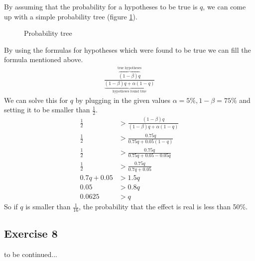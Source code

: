 \documentclass[../main/Notes.tex]{subfiles}
\begin{document}
By assuming that the probability for a hypotheses to be true is $q$, we can come up with a simple probability tree (figure \ref{fig:2014-05-30_ex6tree}).

\begin{figure}[!ht]
  
  \caption{Probability tree}
  \label{fig:2014-05-30_ex6tree}
\end{figure}

By using the formulas for hypotheses which were found to be true we can fill the formula mentioned above.
\begin{align*}
\frac{\overbrace{(1-\beta)q}^\text{true hypotheses}}{\underbrace{(1-\beta)q+\alpha(1-q)}_\text{hypotheses found true}}
\end{align*}
We can solve this for $q$ by plugging in the given values $\alpha=5\%,1-\beta=75\%$ and setting it to be smaller than $\frac{1}{2}$.
\begin{align*}
\frac{1}{2}&>\frac{(1-\beta)q}{(1-\beta)q+\alpha(1-q)} \\
\frac{1}{2}&>\frac{0.75q}{0.75q+0.05(1-q)} \\
\frac{1}{2}&>\frac{0.75q}{0.75q+0.05-0.05q} \\
\frac{1}{2}&>\frac{0.75q}{0.7q+0.05} \\
0.7q+0.05  &>1.5q \\
0.05       &>0.8q \\
0.0625     &>q
\end{align*}
So if $q$ is smaller than $\frac{1}{16}$, the probability that the effect is real is less than 50\%.


\subsection*{Exercise 8}
to be continued...
\end{document}
